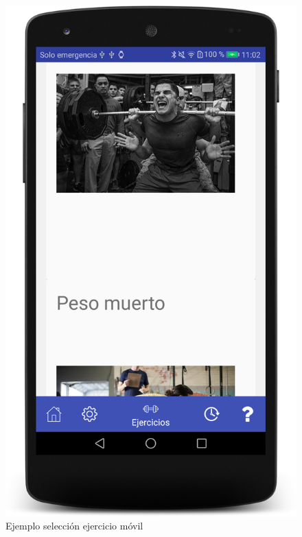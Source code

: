 \begin{figure}[H]
	\centering
	\includegraphics[scale=0.10]{imagenes/m4.png}
	\caption{Ejemplo selección ejercicio móvil}
	\label{Realización ejercicio 2}
\end{figure}

